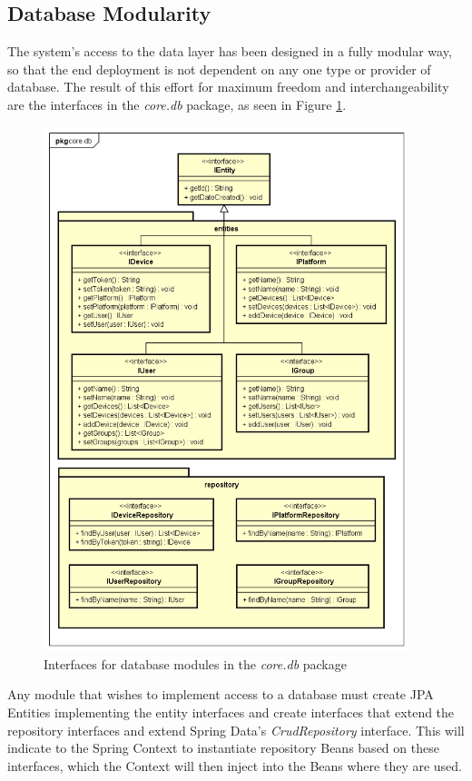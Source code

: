 \subsection{Database Modularity}
The system's access to the data layer has been designed in a fully modular way, so that the end deployment is not dependent on any one type or provider of database. The result of this effort for maximum freedom and interchangeability are the interfaces in the \textit{core.db} package, as seen in Figure \ref{fig:core-db-module}.

\begin{figure}[!ht]
	\centering
	\includegraphics[width=0.95\textwidth]{figures/03_design/core-db-module}
    \caption{Interfaces for database modules in the \textit{core.db} package}
    \label{fig:core-db-module}
\end{figure}

Any module that wishes to implement access to a database must create JPA Entities implementing the entity interfaces and create interfaces that extend the repository interfaces and extend Spring Data's \textit{CrudRepository} interface. This will indicate to the Spring Context to instantiate repository Beans based on these interfaces\cite{spring-repos}, which the Context will then inject into the Beans where they are used.

